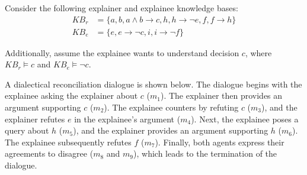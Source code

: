 \documentclass{ecai}
\begin{document}
Consider the following explainer and explainee knowledge bases:
\begin{align*}
      KB_r &= \{ a,b,a\land b \!\rightarrow\! c, h, h\!\rightarrow\!\neg e, f, f \!\rightarrow\! h\} \\
    KB_e &= \{e, e \!\rightarrow\! \neg c, i, i\!\rightarrow\! \neg f \}
\end{align*}

\noindent Additionally, assume the explainee wants to understand decision $c$, where $KB_r \models c$ and $KB_e \models \neg c$. 





A dialectical reconciliation dialogue is shown below. The dialogue begins with the explainee asking the explainer about $c$ ($m_1$). The explainer then provides an argument supporting $c$ ($m_2$). The explainee counters by refuting $c$ ($m_3$), and the explainer refutes $e$ in the explainee's argument ($m_4$). Next, the explainee poses a query about $h$ ($m_5$), and the explainer provides an argument supporting $h$ ($m_6$). The explainee subsequently refutes $f$ ($m_7$). Finally, both agents express their agreements to disagree ($m_8$ and $m_9$), which leads to the termination of the dialogue.

\renewcommand{\arraystretch}{1.2}
\end{document}
